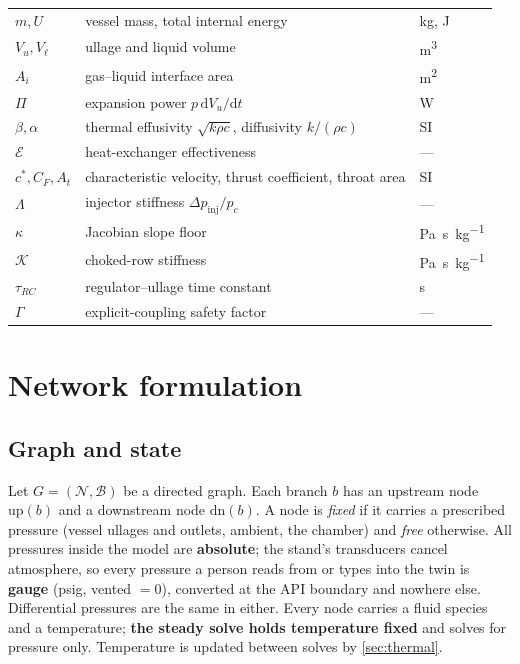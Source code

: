 \documentclass[11pt,a4paper]{article}
\newcommand{\eff}{\mathcal{E}}          %
\begin{document}
\begin{center}
\begin{tabular}{lll}
$m,U$ & vessel mass, total internal energy & \si{\kilogram}, \si{\joule} \\
$V_u,V_\ell$ & ullage and liquid volume & \si{\cubic\metre} \\
$A_i$ & gas--liquid interface area & \si{\square\metre} \\
$\Pi$ & expansion power $p\,\mathrm{d}V_u/\mathrm{d}t$ & \si{\watt} \\
$\beta,\alpha$ & thermal effusivity $\sqrt{k\rho c}$, diffusivity $k/(\rho c)$ & SI \\
$\eff$ & heat-exchanger effectiveness & --- \\
$c^*,C_F,A_t$ & characteristic velocity, thrust coefficient, throat area & SI \\
$\Lambda$ & injector stiffness $\Delta p_{\mathrm{inj}}/p_c$ & --- \\
$\kappa$ & Jacobian slope floor & \si{\pascal\second\per\kilogram} \\
$\mathcal{K}$ & choked-row stiffness & \si{\pascal\second\per\kilogram} \\
$\tau_{RC}$ & regulator--ullage time constant & \si{\second} \\
$\Gamma$ & explicit-coupling safety factor & --- \\
\bottomrule
\end{tabular}
\end{center}

\section{Network formulation}\label{sec:network}

\subsection{Graph and state}
Let $G=(\mathcal{N},\mathcal{B})$ be a directed graph. Each branch $b$ has an
upstream node $\mathrm{up}(b)$ and a downstream node $\mathrm{dn}(b)$. A node
is \emph{fixed} if it carries a prescribed pressure (vessel ullages and
outlets, ambient, the chamber) and \emph{free} otherwise. All pressures inside
the model are \textbf{absolute}; the stand's transducers cancel atmosphere, so
every pressure a person reads from or types into the twin is \textbf{gauge}
(psig, vented $=0$), converted at the API boundary and nowhere else.
Differential pressures are the same in either. Every node carries a
fluid species and a temperature; \textbf{the steady solve holds temperature
fixed} and solves for pressure only. Temperature is updated between solves by
\cref{sec:thermal}.
\end{document}
